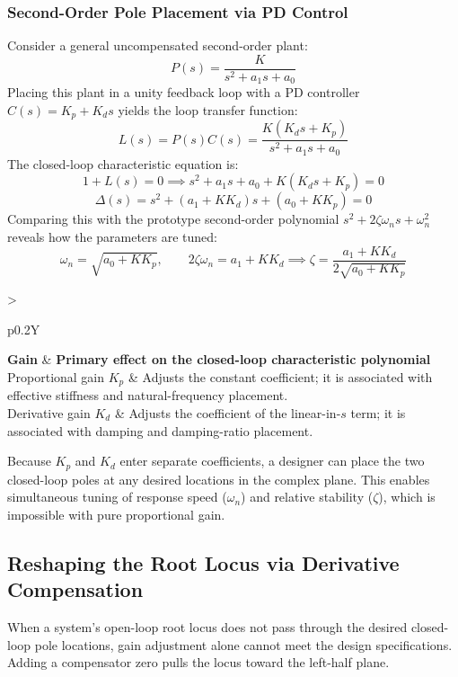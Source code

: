 \documentclass[12pt,onecolumn,twoside ]{article}
\begin{document}
	\subsubsection{Second-Order Pole Placement via PD Control}
	Consider a general uncompensated second-order plant: \[
	P(s) = \frac{K}{s^2 + a_1 s + a_0}
	\] Placing this plant in a unity feedback loop with a PD controller $C(s) = K_p + K_d s$ yields the loop transfer function: \[
	L(s) = P(s)C(s) = \frac{K(K_d s + K_p)}{s^2 + a_1 s + a_0}
	\]
	The closed-loop characteristic equation is: \[
	1 + L(s) = 0 \implies s^2 + a_1 s + a_0 + K(K_d s + K_p) = 0
	\] \[
	\Delta(s) = s^2 + (a_1 + K K_d) s + (a_0 + K K_p) = 0
	\]
	Comparing this with the prototype second-order polynomial $s^2 + 2\zeta\omega_n s + \omega_n^2$ reveals how the parameters are tuned: \[
	\omega_n = \sqrt{a_0 + K K_p}, \qquad 2\zeta\omega_n = a_1 + K K_d \implies \zeta = \frac{a_1 + K K_d}{2\sqrt{a_0 + K K_p}}
	\]
	\begin{center}
		\small
		\begin{tabularx}{\textwidth}{>{\raggedright\arraybackslash}p{}Y}
			\toprule
			\textbf{Gain} & \textbf{Primary effect on the closed-loop characteristic polynomial}\\
			\midrule
			Proportional gain $K_p$ & Adjusts the constant coefficient; it is associated with effective stiffness and natural-frequency placement.\\
			Derivative gain $K_d$ & Adjusts the coefficient of the linear-in-$s$ term; it is associated with damping and damping-ratio placement.\\
			\bottomrule
		\end{tabularx}
	\end{center}
	Because $K_p$ and $K_d$ enter separate coefficients, a designer can place the two closed-loop poles at any desired locations in the complex plane. This enables simultaneous tuning of response speed ($\omega_n$) and relative stability ($\zeta$), which is impossible with pure proportional gain.
	
	\subsection{Reshaping the Root Locus via Derivative Compensation}
	When a system's open-loop root locus does not pass through the desired closed-loop pole locations, gain adjustment alone cannot meet the design specifications. Adding a compensator zero pulls the locus toward the left-half plane.
\end{document}

